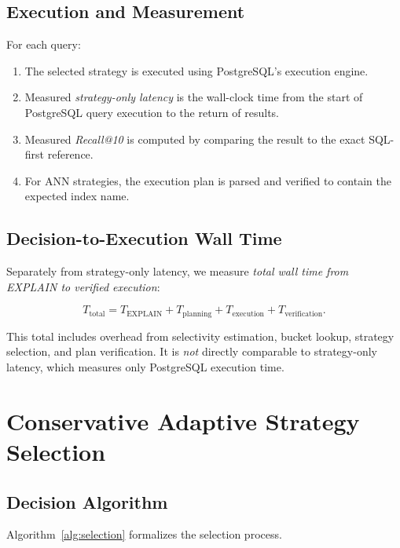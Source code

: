 \documentclass[10pt,twocolumn]{article}
\begin{document}
\subsection{Execution and Measurement}

For each query:
\begin{enumerate}
\item The selected strategy is executed using PostgreSQL's execution engine.
\item Measured \emph{strategy-only latency} is the wall-clock time from the start of PostgreSQL query execution to the return of results.
\item Measured \emph{Recall@10} is computed by comparing the result to the exact SQL-first reference.
\item For ANN strategies, the execution plan is parsed and verified to contain the expected index name.
\end{enumerate}

\subsection{Decision-to-Execution Wall Time}

Separately from strategy-only latency, we measure \emph{total wall time from EXPLAIN to verified execution}:

\begin{equation}
T_{\text{total}} = T_{\text{EXPLAIN}} + T_{\text{planning}} + T_{\text{execution}} + T_{\text{verification}}.
\end{equation}

This total includes overhead from selectivity estimation, bucket lookup, strategy selection, and plan verification. It is \emph{not} directly comparable to strategy-only latency, which measures only PostgreSQL execution time.

\section{Conservative Adaptive Strategy Selection}
\label{sec:selection}

\subsection{Decision Algorithm}

Algorithm~\ref{alg:selection} formalizes the selection process.
\end{document}
